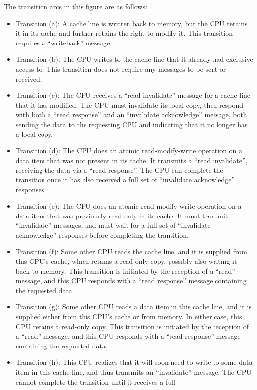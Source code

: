 The transition arcs in this figure are as follows:
\begin{itemize}
\item	Transition (a):
	A cache line is written back to memory, but the CPU retains
	it in its cache and further retains the right to modify it.
	This transition requires a ``writeback'' message.
\item	Transition (b):
	The CPU writes to the cache line that it already had exclusive
	access to.
	This transition does not require any messages to be sent or
	received.
\item	Transition (c):
	The CPU receives a ``read invalidate'' message for a cache line
	that it has modified.
	The CPU must invalidate its local copy, then respond with both a
	``read response'' and an ``invalidate acknowledge'' message,
	both sending the data to the requesting CPU and indicating
	that it no longer has a local copy.
\item	Transition (d):
	The CPU does an atomic read-modify-write operation on a data item
	that was not present in its cache.
	It transmits a ``read invalidate'', receiving the data via
	a ``read response''.
	The CPU can complete the transition once it has also received a
	full set of ``invalidate acknowledge'' responses.
\item	Transition (e):
	The CPU does an atomic read-modify-write operation on a data item
	that was previously read-only in its cache.
	It must transmit ``invalidate'' messages, and must wait for a
	full set of ``invalidate acknowledge'' responses before completing
	the transition.
\item	Transition (f):
	Some other CPU reads the cache line, and it is supplied from
	this CPU's cache, which retains a read-only copy, possibly also
	writing it back to memory.
	This transition is initiated by the reception of a ``read''
	message, and this CPU responds with a ``read response'' message
	containing the requested data.
\item	Transition (g):
	Some other CPU reads a data item in this cache line,
	and it is supplied either from this CPU's cache or from memory.
	In either case, this CPU retains a read-only copy.
	This transition is initiated by the reception of a ``read''
	message, and this CPU responds with a ``read response'' message
	containing the requested data.
\item	Transition (h):
	This CPU realizes that it will soon need to write to some data
	item in this cache line, and thus transmits an ``invalidate'' message.
	The CPU cannot complete the transition until it receives a full

\end{itemize}
